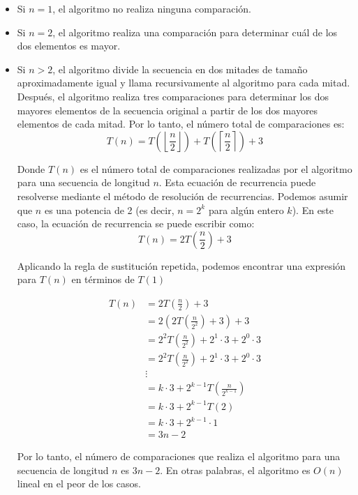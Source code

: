 \begin{itemize}
  \item Si $n = 1$, el algoritmo no realiza ninguna comparación.
  \item Si $n = 2$, el algoritmo realiza una comparación para determinar cuál de los dos elementos es mayor.
  \item Si $n > 2$, el algoritmo divide la secuencia en dos mitades de tamaño aproximadamente igual y 
  llama recursivamente al algoritmo para cada mitad. 
  Después, el algoritmo realiza tres comparaciones para determinar los dos mayores 
  elementos de la secuencia original a partir de los dos mayores elementos de cada mitad. 
  Por lo tanto, el número total de comparaciones es:
 \[ T(n) = T\left(\left\lfloor\frac{n}{2}\right\rfloor\right) + T\left(\left\lceil\frac{n}{2}\right\rceil\right) + 3 \]

  Donde $T(n)$ es el número total de comparaciones realizadas por el algoritmo para una 
  secuencia de longitud $n$. 
  Esta ecuación de recurrencia puede resolverse mediante el método de resolución de recurrencias.
  Podemos asumir que $n$ es 
  una potencia de 2 (es decir, $n = 2^k$ para algún entero $k$). En este caso, 
  la ecuación de recurrencia se puede escribir como:\\
 \[ T(n) = 2T\left(\frac{n}{2}\right) + 3 \]

Aplicando la regla de sustitución repetida, podemos encontrar una expresión para 
$T(n)$ en términos de $T(1)$

\begin{align*}
T(n) &= 2T\left(\frac{n}{2}\right) + 3 \\
&= 2\left(2T\left(\frac{n}{2^2}\right) + 3\right) + 3 \\
&= 2^2 T\left(\frac{n}{2^2}\right) + 2^1\cdot 3 + 2^0\cdot 3 \\
&= 2^2 T\left(\frac{n}{2^2}\right) + 2^1\cdot 3 + 2^0\cdot 3 \\
&\vdots \\
&= k\cdot 3 + 2^{k-1} T\left(\frac{n}{2^{k-1}}\right) \\
&= k\cdot 3 + 2^{k-1} T(2) \\
&= k\cdot 3 + 2^{k-1} \cdot 1 \\
&= 3n - 2
\end{align*}

Por lo tanto, el número de comparaciones que realiza el algoritmo para una secuencia de 
longitud $n$ es $3n - 2$. En otras palabras, el algoritmo es $O(n)$ lineal en el peor de los casos.

\end{itemize}
